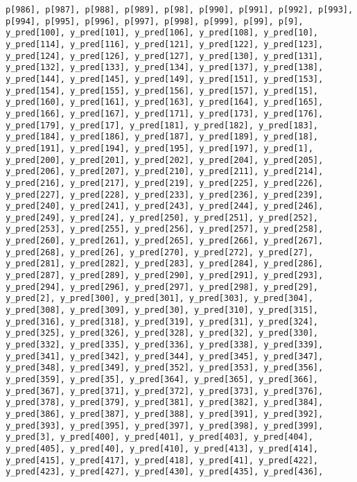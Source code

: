\documentclass[
  letterpaper,
  DIV=11,
  numbers=noendperiod]{scrartcl}
\begin{document}
\begin{verbatim}
p[986], p[987], p[988], p[989], p[98], p[990], p[991], p[992], p[993],
p[994], p[995], p[996], p[997], p[998], p[999], p[99], p[9],
y_pred[100], y_pred[101], y_pred[106], y_pred[108], y_pred[10],
y_pred[114], y_pred[116], y_pred[121], y_pred[122], y_pred[123],
y_pred[124], y_pred[126], y_pred[127], y_pred[130], y_pred[131],
y_pred[132], y_pred[133], y_pred[134], y_pred[137], y_pred[138],
y_pred[144], y_pred[145], y_pred[149], y_pred[151], y_pred[153],
y_pred[154], y_pred[155], y_pred[156], y_pred[157], y_pred[15],
y_pred[160], y_pred[161], y_pred[163], y_pred[164], y_pred[165],
y_pred[166], y_pred[167], y_pred[171], y_pred[173], y_pred[176],
y_pred[179], y_pred[17], y_pred[181], y_pred[182], y_pred[183],
y_pred[184], y_pred[186], y_pred[187], y_pred[189], y_pred[18],
y_pred[191], y_pred[194], y_pred[195], y_pred[197], y_pred[1],
y_pred[200], y_pred[201], y_pred[202], y_pred[204], y_pred[205],
y_pred[206], y_pred[207], y_pred[210], y_pred[211], y_pred[214],
y_pred[216], y_pred[217], y_pred[219], y_pred[225], y_pred[226],
y_pred[227], y_pred[228], y_pred[233], y_pred[236], y_pred[239],
y_pred[240], y_pred[241], y_pred[243], y_pred[244], y_pred[246],
y_pred[249], y_pred[24], y_pred[250], y_pred[251], y_pred[252],
y_pred[253], y_pred[255], y_pred[256], y_pred[257], y_pred[258],
y_pred[260], y_pred[261], y_pred[265], y_pred[266], y_pred[267],
y_pred[268], y_pred[26], y_pred[270], y_pred[272], y_pred[27],
y_pred[281], y_pred[282], y_pred[283], y_pred[284], y_pred[286],
y_pred[287], y_pred[289], y_pred[290], y_pred[291], y_pred[293],
y_pred[294], y_pred[296], y_pred[297], y_pred[298], y_pred[29],
y_pred[2], y_pred[300], y_pred[301], y_pred[303], y_pred[304],
y_pred[308], y_pred[309], y_pred[30], y_pred[310], y_pred[315],
y_pred[316], y_pred[318], y_pred[319], y_pred[31], y_pred[324],
y_pred[325], y_pred[326], y_pred[328], y_pred[32], y_pred[330],
y_pred[332], y_pred[335], y_pred[336], y_pred[338], y_pred[339],
y_pred[341], y_pred[342], y_pred[344], y_pred[345], y_pred[347],
y_pred[348], y_pred[349], y_pred[352], y_pred[353], y_pred[356],
y_pred[359], y_pred[35], y_pred[364], y_pred[365], y_pred[366],
y_pred[367], y_pred[371], y_pred[372], y_pred[373], y_pred[376],
y_pred[378], y_pred[379], y_pred[381], y_pred[382], y_pred[384],
y_pred[386], y_pred[387], y_pred[388], y_pred[391], y_pred[392],
y_pred[393], y_pred[395], y_pred[397], y_pred[398], y_pred[399],
y_pred[3], y_pred[400], y_pred[401], y_pred[403], y_pred[404],
y_pred[405], y_pred[40], y_pred[410], y_pred[413], y_pred[414],
y_pred[415], y_pred[417], y_pred[418], y_pred[41], y_pred[422],
y_pred[423], y_pred[427], y_pred[430], y_pred[435], y_pred[436],

\end{verbatim}
\end{document}
